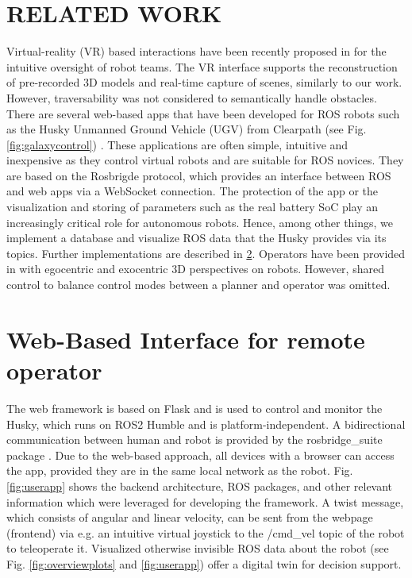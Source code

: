 \documentclass[letterpaper, 10 pt, conference]{ieeeconf}  %
\begin{document}
\section{RELATED WORK}

Virtual-reality (VR) based interactions have been recently proposed in \cite{huang2024evaluation} for the intuitive oversight of robot teams. The VR interface supports the reconstruction of pre-recorded 3D models and real-time capture of scenes, similarly to our work. However,  traversability was not considered to semantically handle obstacles. There are several web-based apps that have been developed for ROS robots such as the Husky Unmanned Ground Vehicle (UGV) from Clearpath (see Fig.\ref{fig:galaxycontrol}) \cite{husky}. These applications are often simple, intuitive and inexpensive as they control virtual robots and are suitable for ROS novices.
They are based on the Rosbrigde protocol, which provides an interface between ROS and web apps via a WebSocket connection\cite{kapic,dinodi,rosbridgeOkState,rosbridgeSuite}.
The protection of the app or the visualization and storing of parameters such as the real battery SoC play an increasingly critical role for autonomous robots.
Hence, among other things, we implement a database and visualize ROS data that the Husky provides via its topics.  Further implementations are described in \ref{sec:framework}.
Operators have been provided in \cite{walker2024cyber} with egocentric and exocentric 3D perspectives on robots. However, shared control to balance control modes between a planner and operator was omitted. 





\section{Web-Based Interface for remote operator}
\label{sec:framework}

The web framework is based on Flask \cite{flask} and is used to control and monitor the Husky, which runs on ROS2 Humble and is platform-independent. A
bidirectional communication between human and robot is provided by the rosbridge\_suite package \cite{rosbridgeSuite}.   
Due to the web-based approach, all devices with a browser can access the app, provided they are in the same local network as the robot.
Fig. \ref{fig:userapp} shows the backend architecture, ROS packages, and other relevant information which were leveraged for developing the framework. 
A twist message, which consists of angular and linear velocity, can be sent from the webpage (frontend) via e.g. 
an intuitive virtual joystick to the /cmd\_vel topic of the robot to teleoperate it. Visualized otherwise invisible ROS data about the robot (see Fig. \ref{fig:overviewplots} and \ref{fig:userapp}) offer a digital twin for decision support.
\end{document}
